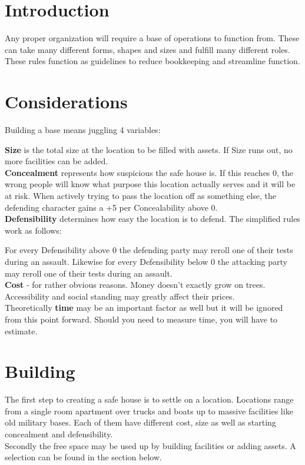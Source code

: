 \documentclass[12pt,a4paper,openany]{book}
\begin{document}
	

	\chapter{Introduction}
	Any proper organization will require a base of operations to function from. These can take many different forms, shapes and sizes and fulfill many different roles. These rules function as guidelines to reduce bookkeeping and streamline function.

	\chapter{Considerations}
	Building a base means juggling 4 variables: \par
	\textbf{Size} is the total size at the location to be filled with assets. If Size runs out, no more facilities can be added.\\
	\textbf{Concealment} represents how suspicious the safe house is. If this reaches 0, the wrong people will know what purpose this location actually serves and it will be at risk. When actively trying to pass the location off as something else, the defending character gains a +5 per Concealability above 0.\\
	\textbf{Defensibility} determines how easy the location is to defend. The simplified rules work as follows: \par \vspace*{-10mm}
	\hspace{15mm}For every Defensibility above 0 the defending party may reroll one of their tests during an assault. Likewise for every Defensibility below 0 the attacking party may reroll one of their tests during an assault.\\
	\textbf{Cost} - for rather obvious reasons. Money doesn't exactly grow on trees. Accessibility and social standing may greatly affect their prices.\\
	Theoretically \textbf{time} may be an important factor as well but it will be ignored from this point forward. Should you need to measure time, you will have to estimate.

	\chapter{Building}
	The first step to creating a safe house is to settle on a location. Locations range from a single room apartment over trucks and boats up to massive facilities like old military bases. Each of them have different cost, size as well as starting concealment and defensibility. \\
	Secondly the free space may be used up by building facilities or adding assets. A selection can be found in the section below.
\end{document}
